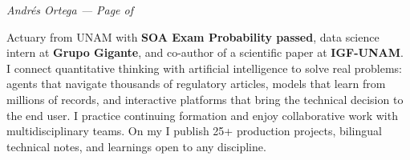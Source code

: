 \documentclass[10pt, letterpaper]{awesome-cv}
\renewcommand{\acvSectionContentTopSkip}{0.3mm}
\renewenvironment{cvparagraph}{%
  \vspace{\acvSectionContentTopSkip}%
  \vspace{-3mm}%
  \paragraphstyle%
}{%
  \par%
  \vspace{0.3mm}%
}
\renewcommand*{\paragraphstyle}{\fontsize{8.5pt}{1.15em}\bodyfontlight\upshape\color{text}}
\begin{document}
\makecvheader[C]


\makecvfooter
  {}
  {\color{lightgray}\textit{\small Andrés Ortega — Page \thepage{} of \pageref*{LastPage}}}
  {}


\begin{cvparagraph}
Actuary from UNAM with \textbf{SOA Exam Probability passed}, data science intern at \textbf{Grupo Gigante}, and co-author of a scientific paper at \textbf{IGF-UNAM}. I connect quantitative thinking with artificial intelligence to solve real problems: agents that navigate thousands of regulatory articles, models that learn from millions of records, and interactive platforms that bring the technical decision to the end user. I practice continuing formation and enjoy collaborative work with multidisciplinary teams. On my  I publish 25+ production projects, bilingual technical notes, and learnings open to any discipline.
\end{cvparagraph}

\end{document}
